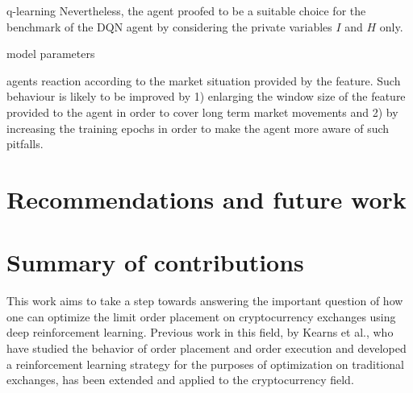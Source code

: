 q-learning Nevertheless, the agent proofed to be a suitable choice for the benchmark of the DQN agent by considering the private variables $I$ and $H$ only.

model parameters

agents reaction according to the market situation provided by the feature.
Such behaviour is likely to be improved by 1) enlarging the window size of the feature provided to the agent in order to cover long term market movements and 2) by increasing the training epochs in order to make the agent more aware of such pitfalls.


\section{Recommendations and future work}

\section{Summary of contributions}

This work aims to take a step towards answering the important question of how one can optimize the limit order placement on cryptocurrency exchanges using deep reinforcement learning.
Previous work in this field, by Kearns et al., who have studied the behavior of order placement and order execution\cite{nevmyvaka2005electronic} and developed a reinforcement learning strategy\cite{nevmyvaka2006reinforcement} for the purposes of optimization on traditional exchanges, has been extended and applied to the cryptocurrency field.

